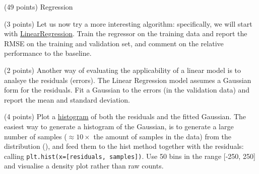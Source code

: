 \documentclass[12pt]{article}
\begin{document}
\begin{question}{\label{Q_LR_BA}(49 points) Regression}
\begin{subquestion}
\end{subquestion}

\begin{subquestion}{(3 points) Let us now try a more interesting algorithm: specifically, we will start with \href{https://scikit-learn.org/stable/modules/generated/sklearn.linear_model.LinearRegression.html}{LinearRegression}. Train the regressor on the training data and report the RMSE on the training and validation set, and comment on the relative performance to the baseline.}






\end{subquestion}



\begin{subquestion}{\label{SQ_LR_RESID}(2 points) Another way of evaluating the applicability of a linear model is to analsye the residuals (errors). The Linear Regression model assumes a Gaussian form for the residuals. Fit a Gaussian to the errors (in the validation data) and report the mean and standard deviation.}






\end{subquestion}

\begin{subquestion}{\label{SQ_LR_RESID_PLT}(4 points) Plot a \href{https://matplotlib.org/3.1.1/api/_as_gen/matplotlib.pyplot.hist.html}{histogram} of both the residuals and the fitted Gaussian. The easiest way to generate a histogram of the Gaussian, is to generate a large number of samples ($\approx10\times$ the amount of samples in the data) from the distribution (), and feed them to the hist method together with the residuals: \ie calling \texttt{plt.hist(x=[residuals, samples])}. Use 50 bins in the range [-250, 250] and visualise a density plot rather than raw counts.}




\end{subquestion}
\end{question}
\end{document}
